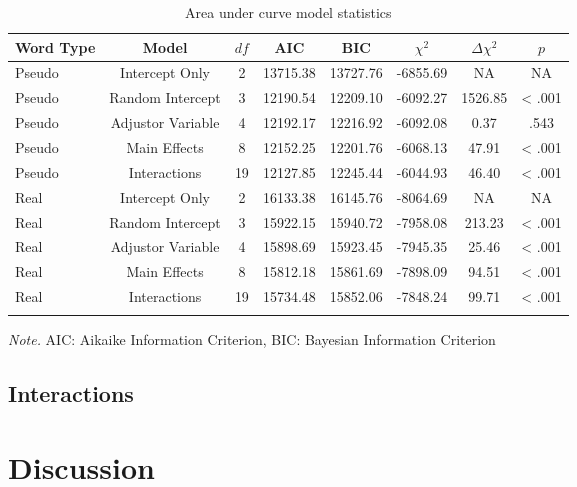\documentclass[english,man]{apa6}
\theoremstyle{definition}
\theoremstyle{definition}
\theoremstyle{definition}
\theoremstyle{remark}
\begin{document}
\begin{table}[tbp]
\begin{center}
\begin{threeparttable}
\caption{\label{tab:model-table2}Area under curve model statistics}
\begin{tabular}{lccccccc}
\toprule
Word Type & Model & $df$ & AIC & BIC & $\chi^2$ & $\Delta\chi^2$ & $p$\\
\midrule
Pseudo & Intercept Only & 2 & 13715.38 & 13727.76 & -6855.69 & NA & NA\\
Pseudo & Random Intercept & 3 & 12190.54 & 12209.10 & -6092.27 & 1526.85 & < .001\\
Pseudo & Adjustor Variable & 4 & 12192.17 & 12216.92 & -6092.08 & 0.37 & .543\\
Pseudo & Main Effects & 8 & 12152.25 & 12201.76 & -6068.13 & 47.91 & < .001\\
Pseudo & Interactions & 19 & 12127.85 & 12245.44 & -6044.93 & 46.40 & < .001\\
Real & Intercept Only & 2 & 16133.38 & 16145.76 & -8064.69 & NA & NA\\
Real & Random Intercept & 3 & 15922.15 & 15940.72 & -7958.08 & 213.23 & < .001\\
Real & Adjustor Variable & 4 & 15898.69 & 15923.45 & -7945.35 & 25.46 & < .001\\
Real & Main Effects & 8 & 15812.18 & 15861.69 & -7898.09 & 94.51 & < .001\\
Real & Interactions & 19 & 15734.48 & 15852.06 & -7848.24 & 99.71 & < .001\\
\bottomrule
\addlinespace
\end{tabular}
\begin{tablenotes}[para]
\textit{Note.} AIC: Aikaike Information Criterion, BIC: Bayesian Information Criterion
\end{tablenotes}
\end{threeparttable}
\end{center}
\end{table}

\subsection{Interactions}\label{interactions-1}

\section{Discussion}\label{discussion}
\end{document}
